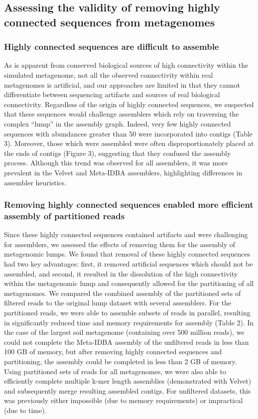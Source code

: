 \documentclass[10pt]{article}
\begin{document}
\subsection*{Assessing the validity of removing highly connected sequences from metagenomes}

\subsubsection*{Highly connected sequences are difficult to assemble}

As is apparent from conserved biological sources of high connectivity
within the simulated metagenome, not all the observed connectivity
within real metagenomes is artificial, and our approaches are limited
in that they cannot differentiate between sequencing artifacts and
sources of real biological connectivity.  Regardless of the origin of
highly connected sequences, we suspected that these sequences would
challenge assemblers which rely on traversing the complex ``lump'' in
the assembly graph.  Indeed, very few highly connected sequences with
abundances greater than 50 were incorporated into contigs (Table
3). Moreover, those which were assembled were often disproportionately placed
at the ends of contigs (Figure 3), suggesting that they confused the
assembly process.  Although this trend was
observed for all assemblers, it was more prevalent in the Velvet and
Meta-IDBA assemblers, highlighting differences in assembler
heuristics.

\subsubsection*{Removing highly connected sequences enabled more efficient assembly of partitioned reads}

Since these highly connected sequences contained artifacts and 
were challenging for assemblers,
we assessed the
effects of removing them for the assembly of metagenomic lumps.  We
found that removal of these highly connected sequences had two key
advantages: first, it removed artificial sequences which should not be
assembled, and second, it resulted in the dissolution of the high
connectivity within the metagenomic lump and consequently allowed for
the partitioning of all metagenomes.  We compared the combined
assembly of the partitioned sets of filtered reads to the original
lump dataset with several assemblers.  For the partitioned reads, we
were able to assemble subsets of reads in parallel, resulting in
significantly reduced time and memory requirements for assembly (Table
2).  In the case of the largest soil metagenome (containing over 500
million reads), we could not complete the Meta-IDBA assembly of the
unfiltered reads in less than 100 GB of memory, but after removing
highly connected sequences and partitioning, the assembly could be
completed in less than 2 GB of memory.  Using partitioned sets of
reads for all metagenomes, we were also able to efficiently complete
multiple k-mer length assemblies (demonstrated with Velvet) and
subsequently merge resulting assembled contigs.  For unfiltered
datasets, this was previously either impossible (due to memory
requirements) or impractical (due to time).
\end{document}
